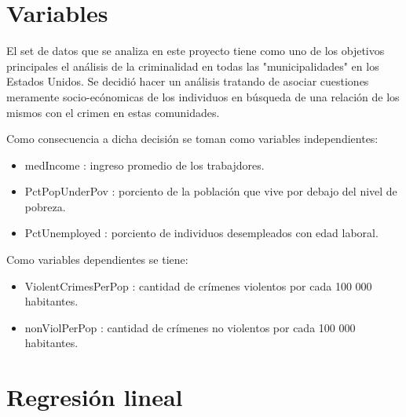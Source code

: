 \documentclass[a4paper,10pt,twocolumn]{article}
\begin{document}
\section{Variables}\label{sec:ex1.0}
El set de datos que se analiza en este proyecto tiene como uno de los objetivos principales el análisis de 
la criminalidad en todas las "municipalidades" en los Estados Unidos. Se decidió hacer un análisis tratando
 de asociar cuestiones meramente socio-ecónomicas de los individuos en búsqueda de una relación de los mismos con 
 el crimen en estas comunidades.

 Como consecuencia a dicha decisión se toman como variables independientes:
 \begin{itemize}
	 \item medIncome : ingreso promedio de los trabajdores.
	 \item PctPopUnderPov : porciento de la población que vive por debajo del nivel de pobreza.
	 \item PctUnemployed : porciento de individuos desempleados con edad laboral.	 
 \end{itemize}

 Como variables dependientes se tiene:
 \begin{itemize}
	 \item ViolentCrimesPerPop : cantidad de crímenes violentos por cada 100 000 habitantes.
	 \item nonViolPerPop : cantidad de crímenes no violentos por cada 100 000 habitantes.
 \end{itemize}
\section{Regresión lineal}\label{sec:ex1.1}
	
		
\end{document}
